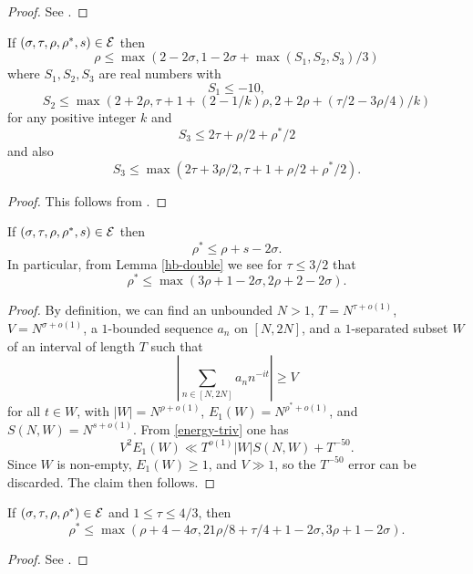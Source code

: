 \begin{proof} See \cite[Lemma 4]{heathbrown_zero_1979}.
\end{proof}

\begin{lemma}\label{gm-1}  If $(\sigma,\tau,\rho,\rho^*,s) \in \mathcal{E}$ then
$$ \rho \leq \max(2-2\sigma, 1-2\sigma + \max(S_1, S_2, S_3)/3)$$
where $S_1, S_2, S_3$ are real numbers with
$$ S_1 \leq -10,$$
$$ S_2 \leq \max(2+2\rho, \tau+1+(2-1/k) \rho, 2 + 2\rho + (\tau/2 - 3\rho/4)/k )$$
for any positive integer $k$ and
$$ S_3 \leq 2\tau + \rho/2 + \rho^*/2$$
and also
$$ S_3 \leq \max( 2\tau + 3\rho/2, \tau+1+\rho/2+\rho^*/2).$$
\end{lemma}

\begin{proof} This follows from \cite[Propositions 4.6, 5.1, 6.1, 8.1, 10.1, (5.5)]{guth-maynard}.
\end{proof}

\begin{lemma}\cite[Lemma 1.7]{guth-maynard}  If $(\sigma,\tau,\rho,\rho^*,s) \in \mathcal{E}$ then
$$ \rho^* \leq \rho + s - 2\sigma.$$
In particular, from Lemma \ref{hb-double} we see for $\tau \leq 3/2$ that
$$ \rho^* \leq \max(3\rho+1-2\sigma, 2\rho+2-2\sigma).$$
\end{lemma}

\begin{proof} By definition, we can find an unbounded $N>1$, $T = N^{\tau+o(1)}$, $V = N^{\sigma+o(1)}$, a $1$-bounded sequence $a_n$ on $[N,2N]$, and a $1$-separated subset $W$ of an interval of length $T$ such that
    $$ |\sum_{n \in [N,2N]} a_n n^{-it}| \geq V$$
    for all $t \in W$, with $|W| = N^{\rho+o(1)}$, $E_1(W) = N^{\rho^*+o(1)}$, and $S(N,W) = N^{s+o(1)}$. From \eqref{energy-triv} one has
$$    V^2 E_1(W) \ll T^{o(1)} |W| S(N,W) + T^{-50}.$$
Since $W$ is non-empty, $E_1(W) \geq 1$, and $V \gg 1$, so the $T^{-50}$ error can be discarded.  The claim then follows.
\end{proof}


\begin{lemma}\label{gm-3}  If $(\sigma,\tau,\rho,\rho^*) \in \mathcal{E}$ and $1 \leq \tau \leq 4/3$, then
    $$ \rho^* \leq \max(\rho+4-4\sigma, 21\rho/8+\tau/4+1-2\sigma, 3\rho+1-2\sigma).$$
\end{lemma}

\begin{proof} See \cite[Proposition 11.1]{guth-maynard}.
\end{proof}

